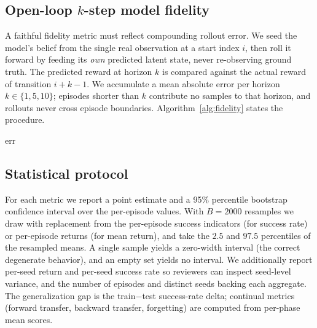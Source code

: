 \documentclass[11pt]{article}
\begin{document}
\subsection{Open-loop $k$-step model fidelity}
A faithful fidelity metric must reflect compounding rollout error. We seed the model's belief from the single real observation at a start index $i$, then roll it forward by feeding its \emph{own} predicted latent state, never re-observing ground truth. The predicted reward at horizon $k$ is compared against the actual reward of transition $i{+}k{-}1$. We accumulate a mean absolute error per horizon $k\in\{1,5,10\}$; episodes shorter than $k$ contribute no samples to that horizon, and rollouts never cross episode boundaries. Algorithm~\ref{alg:fidelity} states the procedure.

\begin{algorithm}[t]
\caption{Open-loop $k$-step model fidelity (per agent with a world model)}\label{alg:fidelity}
\Return $\mathrm{err}$\;
\end{algorithm}

\subsection{Statistical protocol}
For each metric we report a point estimate and a 95\% percentile bootstrap confidence interval over the per-episode values. With $B=2000$ resamples we draw with replacement from the per-episode success indicators (for success rate) or per-episode returns (for mean return), and take the $2.5$ and $97.5$ percentiles of the resampled means. A single sample yields a zero-width interval (the correct degenerate behavior), and an empty set yields no interval. We additionally report per-seed return and per-seed success rate so reviewers can inspect seed-level variance, and the number of episodes and distinct seeds backing each aggregate. The generalization gap is the train$-$test success-rate delta; continual metrics (forward transfer, backward transfer, forgetting) are computed from per-phase mean scores.
\end{document}
